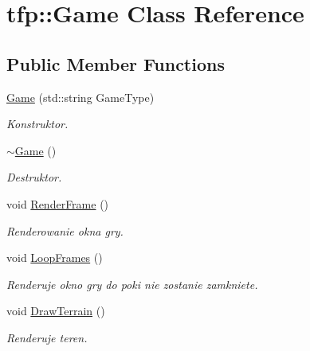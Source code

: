 \hypertarget{classtfp_1_1_game}{}\section{tfp\+:\+:Game Class Reference}
\label{classtfp_1_1_game}
\subsection*{Public Member Functions}
\begin{DoxyCompactItemize}
\item 
\mbox{\label{classtfp_1_1_game_a2fb3e11c981234aa538acf6354215c06}} 
\mbox{\hyperlink{classtfp_1_1_game_a2fb3e11c981234aa538acf6354215c06}{Game}} (std\+::string Game\+Type)
\begin{DoxyCompactList}\small\item\em Konstruktor. \end{DoxyCompactList}\item 
\mbox{\label{classtfp_1_1_game_a777184f7f1e916aa5d41c0b8777d2954}} 
\mbox{\hyperlink{classtfp_1_1_game_a777184f7f1e916aa5d41c0b8777d2954}{$\sim$\+Game}} ()
\begin{DoxyCompactList}\small\item\em Destruktor. \end{DoxyCompactList}\item 
void \mbox{\hyperlink{classtfp_1_1_game_ae5554bf120f7ee523be08ea14efe6be2}{Render\+Frame}} ()
\begin{DoxyCompactList}\small\item\em Renderowanie okna gry. \end{DoxyCompactList}\item 
\mbox{\label{classtfp_1_1_game_aae070860eee820757b78f1465b2f7916}} 
void \mbox{\hyperlink{classtfp_1_1_game_aae070860eee820757b78f1465b2f7916}{Loop\+Frames}} ()
\begin{DoxyCompactList}\small\item\em Renderuje okno gry do poki nie zostanie zamkniete. \end{DoxyCompactList}\item 
void \mbox{\hyperlink{classtfp_1_1_game_a2ada50634779cf906814188793bc6fd3}{Draw\+Terrain}} ()
\begin{DoxyCompactList}\small\item\em Renderuje teren. \end{DoxyCompactList}\item 

\end{DoxyCompactItemize}
